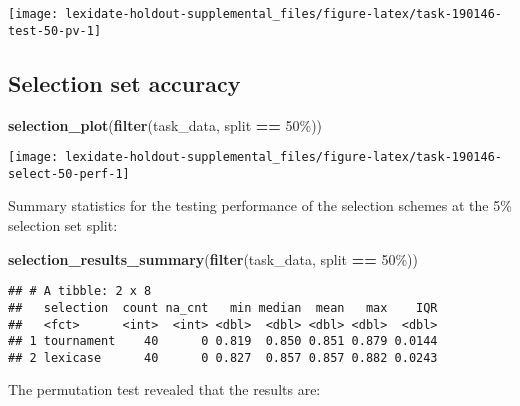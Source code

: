 \documentclass[
]{book}
\newenvironment{Shaded}{\begin{snugshade}}{\end{snugshade}}
\newcommand{\FunctionTok}[1]{\textcolor[rgb]{0.13,0.29,0.53}{\textbf{#1}}}
\newcommand{\NormalTok}[1]{#1}
\newcommand{\SpecialCharTok}[1]{\textcolor[rgb]{0.81,0.36,0.00}{\textbf{#1}}}
\newcommand{\StringTok}[1]{\textcolor[rgb]{0.31,0.60,0.02}{#1}}
\begin{document}
\texttt{[image: lexidate-holdout-supplemental\_files/figure-latex/task-190146-test-50-pv-1]}

\hypertarget{selection-set-accuracy-17}{%
\subsection{Selection set accuracy}\label{selection-set-accuracy-17}}

\begin{Shaded}
\begin{Highlighting}[]
\FunctionTok{selection\_plot}\NormalTok{(}\FunctionTok{filter}\NormalTok{(task\_data, split }\SpecialCharTok{==} \StringTok{\textquotesingle{}50\%\textquotesingle{}}\NormalTok{))}
\end{Highlighting}
\end{Shaded}

\texttt{[image: lexidate-holdout-supplemental\_files/figure-latex/task-190146-select-50-perf-1]}

Summary statistics for the testing performance of the selection schemes at the 5\% selection set split:

\begin{Shaded}
\begin{Highlighting}[]
\FunctionTok{selection\_results\_summary}\NormalTok{(}\FunctionTok{filter}\NormalTok{(task\_data, split }\SpecialCharTok{==} \StringTok{\textquotesingle{}50\%\textquotesingle{}}\NormalTok{))}
\end{Highlighting}
\end{Shaded}

\begin{verbatim}
## # A tibble: 2 x 8
##   selection  count na_cnt   min median  mean   max    IQR
##   <fct>      <int>  <int> <dbl>  <dbl> <dbl> <dbl>  <dbl>
## 1 tournament    40      0 0.819  0.850 0.851 0.879 0.0144
## 2 lexicase      40      0 0.827  0.857 0.857 0.882 0.0243
\end{verbatim}

The permutation test revealed that the results are:
\end{document}
